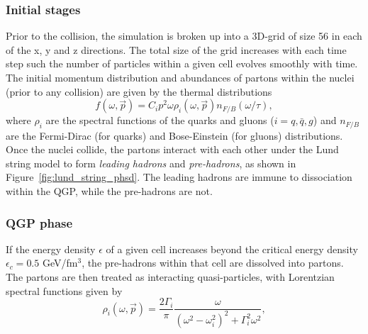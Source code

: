 \subsubsection{Initial stages}
Prior to the collision, the simulation is broken up into a 3D-grid of size 56 in each of the x, y and z directions. The total size of the grid increases with each time step such the number of particles within a given cell evolves smoothly with time. The initial momentum distribution and abundances of partons within the nuclei (prior to any collision) are given by the thermal distributions
\begin{equation}
    f(\omega, \vec{p}) = C_i p^2 \omega \rho_i(\omega, \vec{p}) n_{F / B}(\omega / \tau),
\end{equation}
where $\rho_i$ are the spectral functions of the quarks and gluons ($i = q, \bar{q}, g$) and $n_{F / B}$ are the Fermi-Dirac (for quarks) and Bose-Einstein (for gluons) distributions. Once the nuclei collide, the partons interact with each other under the Lund string model to form \textit{leading hadrons} and \textit{pre-hadrons}, as shown in Figure~\ref{fig:lund_string_phsd}. The leading hadrons are immune to dissociation within the QGP, while the pre-hadrons are not. 


\subsubsection{QGP phase}
If the energy density $\epsilon$ of a given cell increases beyond the critical energy density $\epsilon_c = 0.5$ GeV/fm$^3$, the pre-hadrons within that cell are dissolved into partons. The partons are then treated as interacting quasi-particles, with Lorentzian spectral functions given by
\begin{equation}
    \rho_i(\omega, \vec{p}) = \frac{2 \Gamma_i}{\pi} \frac{\omega}{(\omega^2 - \omega_i^2)^2 + \Gamma_i^2 \omega^2},
\end{equation}